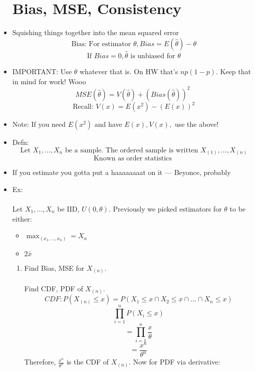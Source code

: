\documentclass{article}
\begin{document}
  \begin{itemize}
    \section*{Bias, MSE, Consistency}
    \item Squishing things together into the mean squared error
      \[
        \text{ Bias: For estimator } \theta, Bias = E( \hat{\theta} ) - \theta
      \] 
      \[
        \text{ If } Bias = 0, \hat{\theta} \text{ is unbiased for } \theta
      \] 
    \item IMPORTANT\@: Use $ \theta $ whatever that is. On HW that's  $ np(1 - p) $. Keep that in mind for work! Wooo 
      \[
        MSE( \hat{\theta}) = V( \hat{\theta})  + {(Bias( \hat{\theta}))}^2
      \]
      \[
        \text{ Recall: } V(x) = E(x^2) - {(E(x))}^2
      \]
    \item Note: If you need $ E(x^2) $ and have  $ E(x), V(x), $ use the above!
    \item Defn:
      \[
        \text{ Let } X_1, \ldots, X_n \text{ be a sample. The ordered sample is written } X_{(1)}, \ldots, X_{(n)}
      \] 
      \[
        \text{ Known as order statistics }
      \] 
    \item If you estimate you gotta put a haaaaaaaat on it --- Beyonce, probably
    \item Ex:
      \\\\ Let $ X_1, \ldots, X_n $ be IID, $ U(0, \theta) $. Previously we picked estimators for $ \theta $ to be either:
      \begin{itemize}
        \item $ \max_(x_1, \ldots, x_n) = X_n$
        \item $ 2 \bar{x} $
      \end{itemize}
      \begin{enumerate}
        \item Find Bias, MSE for $ X_{(n)} $.
          \\\\ Find CDF, PDF of $ X_{(n)} $.
          \[
            CDF: P(X_{(n)} \leq x) = P(X_1 \leq x \cap X_2 \leq x \cap \ldots \cap X_n \leq x)
          \] 
          \[
            \prod_{i = 1}^{n} P(X_i \leq x)
          \] 
          \[
            = \prod_{i = 1}^{n} \frac{x}{\theta}
          \] 
          \[
            = \frac{x^n}{\theta^n}
          \] 
          Therefore, $ \frac{x^n}{\theta^n} $ is the CDF of $ X_{(n)} $. Now for PDF via derivative:

\end{enumerate}
\end{itemize}
\end{document}
